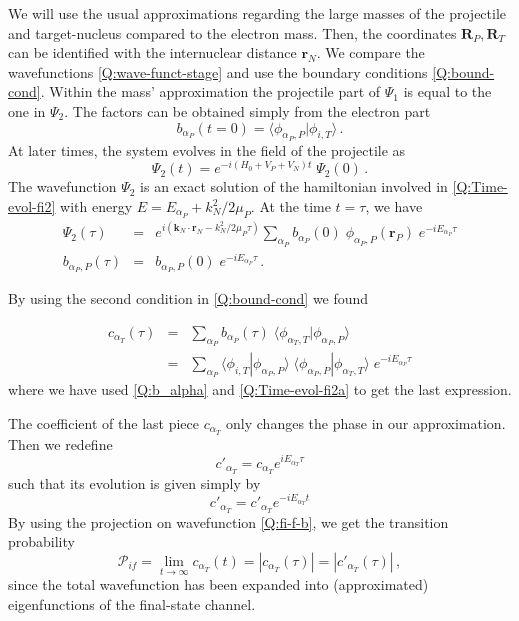 We will use the usual approximations regarding the large masses of the
projectile and target-nucleus compared to the electron mass. Then, the
coordinates $\bm{R}_{P}, \bm{R}_{T}$ can be identified with the
internuclear distance $\bm{r}_{N}$. We compare the wavefunctions
\ref{Q:wave-funct-stage} and use the boundary conditions
\ref{Q:bound-cond}. Within the mass' approximation the projectile part
of $\Psi_{1}$ is equal to the one in $\Psi_{2}$. The factors can be
obtained simply from the electron part
%
\begin{equation}\label{Q:b_alpha}
b_{\alpha_{P}}(t=0) = \langle \phi_{\alpha_{P},P} | \phi_{i,T} \rangle
\, .
\end{equation}
%
At later times, the system evolves in the field of the projectile as
%
\begin{equation}\label{Q:Time-evol-fi2}
\Psi_{2}(t) = e^{- i (H_{0}+V_{P}+V_{N}) t} \; \Psi_{2}(0) \, .
\end{equation}
%
The wavefunction $\Psi_{2}$ is an exact solution of the hamiltonian
involved in \ref{Q:Time-evol-fi2} with energy $E = E_{\alpha_{P}}+
k_{N}^{2}/2 \mu_{P}$. At the time $t=\tau$, we have
\begin{eqnarray} \label{Q:Time-evol-fi2a}
\Psi_{2}(\tau) &=& e^{i\left(\bm{k}_{N} \cdot \bm{r}_{N} -
k_{N}^{2}/2 \mu_{P} \tau \right)} \sum_{\alpha_{P}} b_{\alpha_{P}}(0)
\; \phi_{\alpha_{P},P}(\bm{r}_{P}) \; e^{-i E_{\alpha_{P}} \tau}
\nonumber
\\
b_{\alpha_{P},P}(\tau) &=& b_{\alpha_{P},P}(0) \; e^{- i
E_{\alpha_{P}} \tau} \, .
\end{eqnarray}

  \noindent
By using the second condition in \ref{Q:bound-cond} we found

\begin{eqnarray} \label{Q:c-alfaT-exact}
c_{\alpha_{T}}(\tau) &=& \sum_{\alpha_{P}} b_{\alpha_{P}}(\tau) \;
\langle \phi_{\alpha_{T},T} |\phi_{\alpha_{P},P} \rangle \nonumber
\\
&=& \sum_{\alpha_{P}} \langle \phi_{i,T} | \phi_{\alpha_{P},P} \rangle
\; \langle \phi_{\alpha_{P},P} | \phi_{\alpha_{T},T} \rangle \;
e^{-i E_{\alpha_{P}} \tau}
\end{eqnarray}
where we have used \ref{Q:b_alpha} and \ref{Q:Time-evol-fi2a} to get
the last expression.

The coefficient of the last piece $c_{\alpha_{T}}$ only changes the
phase in our approximation. Then we redefine
\[
c'_{\alpha_{T}} = c_{\alpha_{T}} e^{i E_{\alpha_{T}} \tau}
\]
such that its evolution is given simply by
\[
 c'_{\alpha_{T}} = c'_{\alpha_{T}} e^{-i E_{\alpha_{T}} t}
\]
%
By using the projection on wavefunction \ref{Q:fi-f-b}, we get the
transition probability
\[
\mathcal{P}_{if} = \lim_{t \to \infty} c_{\alpha_{T}}(t) =
|c_{\alpha_{T}}(\tau)| = |c'_{\alpha_{T}}(\tau)| \,,
\]
since the total wavefunction has been expanded into (approximated)
eigenfunctions of the final-state channel.

